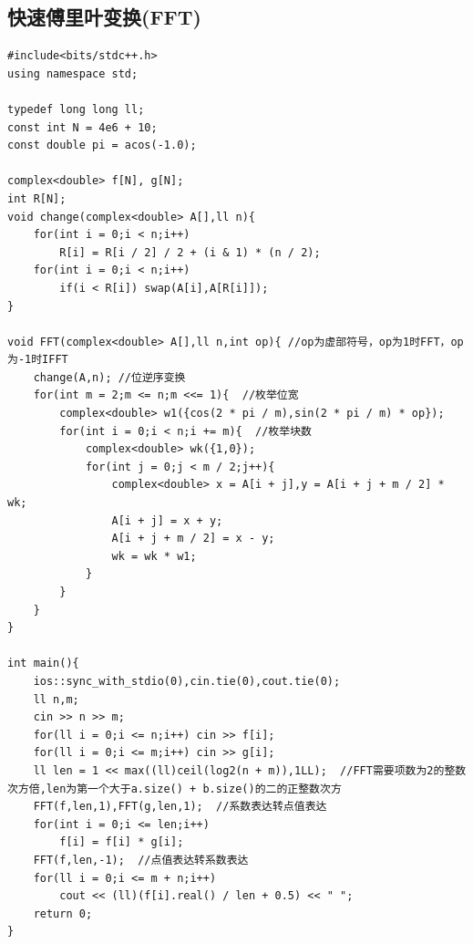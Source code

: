\subsection{快速傅里叶变换(FFT)}
\begin{lstlisting}[caption={}]
#include<bits/stdc++.h>
using namespace std;

typedef long long ll;
const int N = 4e6 + 10;
const double pi = acos(-1.0);

complex<double> f[N], g[N];
int R[N];
void change(complex<double> A[],ll n){
	for(int i = 0;i < n;i++)
		R[i] = R[i / 2] / 2 + (i & 1) * (n / 2);
	for(int i = 0;i < n;i++)
		if(i < R[i]) swap(A[i],A[R[i]]);
}

void FFT(complex<double> A[],ll n,int op){ //op为虚部符号，op为1时FFT，op为-1时IFFT
	change(A,n); //位逆序变换
	for(int m = 2;m <= n;m <<= 1){  //枚举位宽 
		complex<double> w1({cos(2 * pi / m),sin(2 * pi / m) * op});
		for(int i = 0;i < n;i += m){  //枚举块数 
			complex<double> wk({1,0});
			for(int j = 0;j < m / 2;j++){
				complex<double> x = A[i + j],y = A[i + j + m / 2] * wk;
				A[i + j] = x + y;
				A[i + j + m / 2] = x - y;
				wk = wk * w1;
			}
		}
	} 
}

int main(){
	ios::sync_with_stdio(0),cin.tie(0),cout.tie(0);
	ll n,m;
	cin >> n >> m;
	for(ll i = 0;i <= n;i++) cin >> f[i];
	for(ll i = 0;i <= m;i++) cin >> g[i];
	ll len = 1 << max((ll)ceil(log2(n + m)),1LL);  //FFT需要项数为2的整数次方倍,len为第一个大于a.size() + b.size()的二的正整数次方
	FFT(f,len,1),FFT(g,len,1);  //系数表达转点值表达
	for(int i = 0;i <= len;i++)
		f[i] = f[i] * g[i];
	FFT(f,len,-1);  //点值表达转系数表达
	for(ll i = 0;i <= m + n;i++)
		cout << (ll)(f[i].real() / len + 0.5) << " ";
	return 0;
}
\end{lstlisting}

